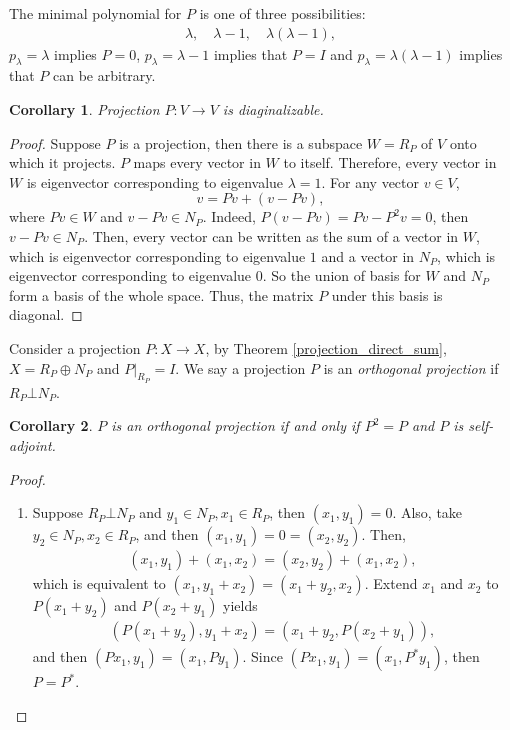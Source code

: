 \documentclass[11pt]{book}
\newtheorem{corollary}{Corollary}[theorem]
\theoremstyle{definition}
\numberwithin{equation}{chapter}
\begin{document}
\begin{subappendices}
The minimal polynomial for $P$ is one of three possibilities:
\begin{align*}
    \lambda, \quad \lambda - 1, \quad \lambda(\lambda - 1),
\end{align*}
$p_\lambda = \lambda$ implies $P = 0$, $p_\lambda = \lambda - 1$ implies that $P = I$ and $p_\lambda = \lambda(\lambda - 1)$ implies that $P$ can be arbitrary. 

\medskip

\begin{corollary}{\rm \cite{33}}
Projection $P: V \to V$ is diaginalizable.
\end{corollary}
\begin{proof}
Suppose $P$ is a projection, then there is a subspace $W = R_P$ of $V$ onto which it projects. $P$ maps every vector in $W$ to itself. Therefore, every vector in $W$ is eigenvector corresponding to eigenvalue $\lambda = 1$. For any vector $v \in V$, 
$$v = Pv + (v - Pv),$$ 
where $Pv \in W$ and $v - Pv \in N_P$. Indeed, $P(v - Pv) = Pv - P^2 v = 0$, then $v - Pv \in N_P$. Then, every vector can be written as the sum of a vector in $W$, which is eigenvector corresponding to eigenvalue $1$ and a vector in $N_P$, which is eigenvector corresponding to eigenvalue $0$. So the union of basis for $W$ and $N_P$ form a basis of the whole space. Thus, the matrix $P$ under this basis is diagonal.
\end{proof}

\medskip

Consider a projection $P: X \to X$, by Theorem \ref{projection_direct_sum}, $X = R_P \oplus N_P$ and $P|_{R_P} = I$. We say a projection $P$ is an {\em orthogonal projection} if $R_P \bot N_P$.

\medskip

\begin{corollary}\label{coro_10322}
$P$ is an orthogonal projection if and only if $P^2 = P$ and $P$ is self-adjoint.
\end{corollary}
\begin{proof}
~\begin{enumerate}[label=(\alph*)]
    \item Suppose $R_P \bot N_P$ and $y_1 \in N_P, x_1 \in R_P$, then $(x_1, y_1) = 0$. Also, take $y_2 \in N_P, x_2 \in R_P$, and then $(x_1, y_1) = 0 = (x_2, y_2)$. Then,
    \begin{align*}
        (x_1, y_1) + (x_1, x_2) = (x_2, y_2) + (x_1, x_2),
    \end{align*}
    which is equivalent to $(x_1, y_1 + x_2) = (x_1 + y_2, x_2)$. Extend $x_1$ and $x_2$ to $P(x_1 + y_2)$ and $P(x_2 + y_1)$\cite{34} yields 
    \begin{align*}
        (P(x_1 + y_2), y_1 + x_2) = (x_1 + y_2, P(x_2 + y_1)),
    \end{align*}
    and then $(Px_1, y_1) = (x_1, Py_1)$. Since $(Px_1, y_1) = (x_1, P^*y_1)$, then $P = P^*$.
    

\end{enumerate}
\end{proof}
\end{subappendices}
\end{document}
